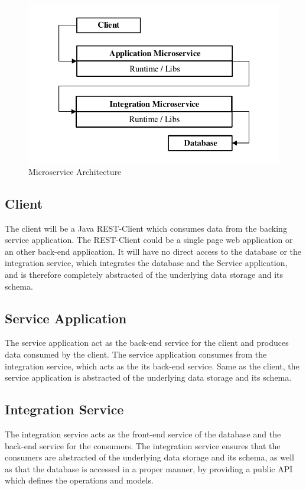 \begin{figure}[htbp]
	\centering
	\includegraphics[scale=1]{images/esboc-design-microservice.pdf}
	\caption{Microservice Architecture}
	\label{fig:esboc-design-services}
\end{figure}

\subsection{Client}
\label{sec:esboc-design-service-client}
The client will be a Java REST-Client which consumes data from the backing service application. The REST-Client could be a single page web application or an other back-end application. It will have no direct access to the database or the integration service, which integrates the database and the Service application, and is therefore completely abstracted of the underlying data storage and its schema.

\subsection{Service Application}
\label{sec:esboc-design-service-app}
The service application act as the back-end service for the client and produces data consumed by the client. The service application consumes from the integration service, which acts as the its back-end service. Same as the client, the service application is abstracted of the underlying data storage and its schema. 

\subsection{Integration Service}
\label{sec:esboc-design-service-integration}
The integration service acts as the front-end service of the database and the back-end service for the consumers. The integration service ensures that the consumers are abstracted of the underlying data storage and its schema, as well as that the database is accessed in a proper manner, by providing a public API which defines the operations and models.

